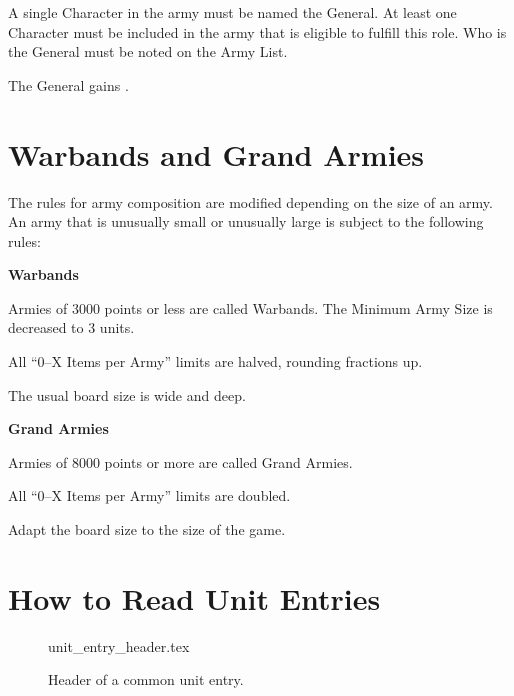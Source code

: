 A single Character in the army must be named the General. At least one Character must be included in the army that is eligible to fulfill this role. Who is the General must be noted on the Army List.

The General gains  \hyperref[commanding_presence]{\commandingpresence}.

\section{Warbands and Grand Armies}
\label{warbands_and_grand_armies}

The rules for army composition are modified depending on the size of an army. An army that is unusually small or unusually large is subject to the following rules:

\begin{center}\textbf{Warbands}\end{center}%

Armies of 3000 points or less are called Warbands. The Minimum Army Size is decreased to 3 units.

All \enquote{0--X Items per Army} limits are halved, rounding fractions up.

The usual board size is  wide and  deep.

\begin{center}\textbf{Grand Armies}\end{center}%

Armies of 8000 points or more are called Grand Armies.

All \enquote{0--X Items per Army} limits are doubled.

Adapt the board size to the size of the game.

\section{How to Read Unit Entries}
\label{how_to_read_unit_entries}

\newcommand{\figTMHOne}{1 -- Unit name}
\newcommand{\figTMHTwo}{2 -- Army Category}
\newcommand{\figTMHThree}{3 -- Unit size}
\newcommand{\figTMHFour}{4 -- Unit cost}
\newcommand{\figTMHFive}{5 -- Scoring}
\newcommand{\figTMHSix}{6 -- Unit cap}
\newcommand{\figTMHSeven}{7 -- Model specifications}

\begin{figure}[!t]
	{unit_entry_header.tex}
	\caption{Header of a common unit entry.}
	\label{figure/unit_entry_header}
	\vspace*{-10pt}
\end{figure}

